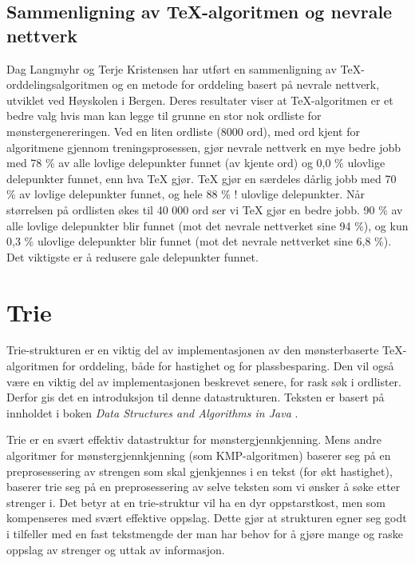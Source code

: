 \subsection{Sammenligning av \TeX{}-algoritmen og nevrale nettverk}
\label{sec:dag-tex}

Dag Langmyhr og Terje Kristensen \cite{kristensen1998two} har utført en sammenligning av \TeX{}-orddelingsalgoritmen og en metode for orddeling basert på nevrale nettverk, utviklet ved Høyskolen i Bergen. Deres resultater viser at \TeX{}-algoritmen er et bedre valg hvis man kan legge til grunne en stor nok ordliste for mønstergenereringen. Ved en liten ordliste (8000 ord), med ord kjent for algoritmene gjennom treningsprosessen, gjør nevrale nettverk en mye bedre jobb med 78 \% av alle lovlige delepunkter funnet (av kjente ord) og 0,0 \% ulovlige delepunkter funnet, enn hva \TeX{} gjør. \TeX{} gjør en særdeles dårlig jobb med 70 \% av lovlige delepunkter funnet, og hele 88 \% ! ulovlige delepunkter. Når størrelsen på ordlisten økes til 40 000 ord ser vi \TeX{} gjør en bedre jobb. 90 \% av alle lovlige delepunkter blir funnet (mot det nevrale nettverket sine 94 \%), og kun 0,3 \% ulovlige delepunkter blir funnet (mot det nevrale nettverket sine 6,8 \%). Det viktigste er å redusere gale delepunkter funnet.
 
\section{Trie}
\label{sec:trie}

Trie-strukturen er en viktig del av implementasjonen av den mønsterbaserte \TeX{}-algoritmen for orddeling, både for hastighet og for plassbesparing. Den vil også være en viktig del av implementasjonen beskrevet senere, for rask søk i ordlister. Derfor gis det en introduksjon til denne datastrukturen. Teksten er basert på innholdet i boken \textit{Data Structures and Algorithms in Java} \cite{goodrich2014data}.

Trie er en svært effektiv datastruktur for mønstergjennkjenning. Mens andre algoritmer for mønstergjennkjenning (som KMP-algoritmen) baserer seg på en preprosessering av strengen som skal gjenkjennes i en tekst (for økt hastighet), baserer trie seg på en preprosessering av selve teksten som vi ønsker å søke etter strenger i. Det betyr at en trie-struktur vil ha en dyr oppstarstkost, men som kompenseres med svært effektive oppslag. Dette gjør at strukturen egner seg godt i tilfeller med en fast tekstmengde der man har behov for å gjøre mange og raske oppslag av strenger og uttak av informasjon.


